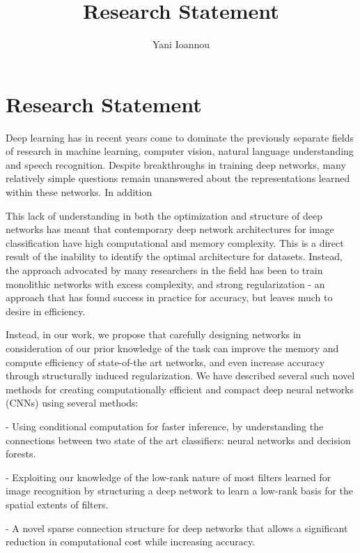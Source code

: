 \documentclass[]{article}
\title{Research Statement}
\author{Yani Ioannou}
\begin{document}
\maketitle



\section{Research Statement}
Deep learning has in recent years come to dominate the previously separate fields of research in machine learning, computer vision, natural language understanding and speech recognition. Despite breakthroughs in training deep networks, many relatively simple questions remain unanswered about the representations learned within these networks. In addition 

This lack of understanding in both the optimization and structure of deep networks has meant that contemporary deep network architectures for image classification have high computational and memory complexity. This is a direct result of the inability to identify the optimal architecture for datasets. Instead, the approach advocated by many researchers in the field has been to train monolithic networks with excess complexity, and strong regularization - an approach that has found success in practice for accuracy, but leaves much to desire in efficiency.

Instead, in our work, we propose that carefully designing networks in consideration of our prior knowledge of the task can improve the memory and compute efficiency of state-of-the art networks, and even increase accuracy through structurally induced regularization. We have described several such novel methods for creating computationally efficient and compact deep neural networks (CNNs) using several methods:

- Using conditional computation for faster inference, by understanding the connections between two state of the art classifiers: neural networks and decision forests.

- Exploiting our knowledge of the low-rank nature of most filters learned for image recognition by structuring a deep network to learn a low-rank basis for the spatial extents of filters.

- A novel sparse connection structure for deep networks that allows a significant reduction in computational cost while increasing accuracy.
\pagebreak
\end{document}
